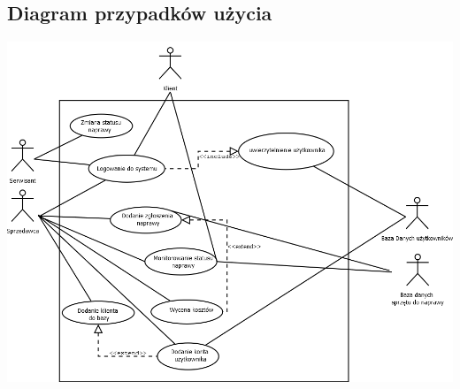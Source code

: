 \documentclass{article}
\begin{document}
\subsection{Diagram przypadków użycia}
\includegraphics[scale=0.4]{diagrams/use_case_diagram.png}
\end{document}
